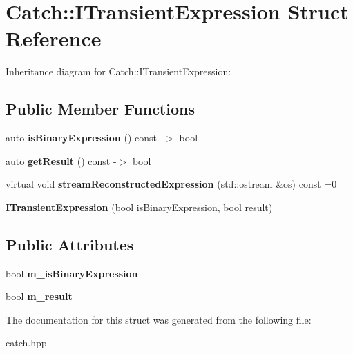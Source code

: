 \hypertarget{structCatch_1_1ITransientExpression}{}\section{Catch\+:\+:I\+Transient\+Expression Struct Reference}
\label{structCatch_1_1ITransientExpression}


Inheritance diagram for Catch\+:\+:I\+Transient\+Expression\+:
\subsection*{Public Member Functions}
\begin{DoxyCompactItemize}
\item 
\mbox{\label{structCatch_1_1ITransientExpression_a3b436e13a0a6d3522bbf70d4e31deb22}} 
auto {\bfseries is\+Binary\+Expression} () const -\/$>$ bool
\item 
\mbox{\label{structCatch_1_1ITransientExpression_a101c7db86c87eff93a8ff496720e6320}} 
auto {\bfseries get\+Result} () const -\/$>$ bool
\item 
\mbox{\label{structCatch_1_1ITransientExpression_aabe1889df9c6e639a24afb08d8a0fe9e}} 
virtual void {\bfseries stream\+Reconstructed\+Expression} (std\+::ostream \&os) const =0
\item 
\mbox{\label{structCatch_1_1ITransientExpression_aafe69572b7ed884e63ec81f58d4afd8c}} 
{\bfseries I\+Transient\+Expression} (bool is\+Binary\+Expression, bool result)
\end{DoxyCompactItemize}
\subsection*{Public Attributes}
\begin{DoxyCompactItemize}
\item 
\mbox{\label{structCatch_1_1ITransientExpression_a75ce48da824d514d08152d396abb28d8}} 
bool {\bfseries m\+\_\+is\+Binary\+Expression}
\item 
\mbox{\label{structCatch_1_1ITransientExpression_a4646e2b5e0156e913653ec3b9b60c942}} 
bool {\bfseries m\+\_\+result}
\end{DoxyCompactItemize}


The documentation for this struct was generated from the following file\+:\begin{DoxyCompactItemize}
\item 
catch.\+hpp\end{DoxyCompactItemize}
